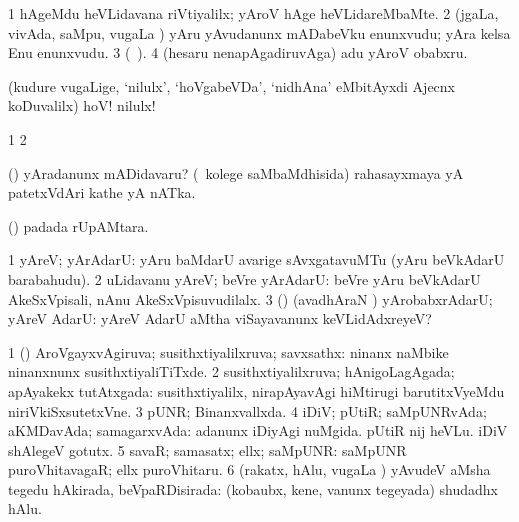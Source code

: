 {{{{{{\noindent 
\gl{\pagu}
\bmng
\bnum
\num{1}  hAgeMdu heVLidavana riVtiyalilx; yAroV hAge heVLidareMbaMte. 
\num{2}  (jgaLa, vivAda, saMpu, \mo vugaLa \vi) yAru yAvudanunx mADabeVku enunxvudu; yAra kelsa Enu enunxvudu. 
\num{3}  (\pagu\ ). 
\num{4} (hesaru nenapAgadiruvAga) adu yAroV obabxru. 
\enum
\emng
\eentry

\bentry
{}
  \gl{\BAavayx}\bmng
(kudure \mo vugaLige, `nilulx', `hoVgabeVDa', `nidhAna' eMbitAyxdi Ajecnx koDuvalilx) hoV! nilulx! 
\emng
\eentry

\bentry
{}
  \gl{\saMkiSx}\bmng
\bnum
\num{1}  
\num{2} 
\enum
\emng
\eentry

\bentry
{}
  \gl{\nA}\bmng
(\AmA) yAradanunx mADidavaru? (\kanmu\ kolege saMbaMdhisida) rahasayxmaya yA patetxVdAri kathe yA nATka. 
\emng
\eentry

\bentry
{}
  \gl{\sanA}\bmng
(\kAparx)  padada rUpAMtara. 
\emng
\eentry

\bentry
{} 
\gl{\sanA}
\expl{}
\bmng
\bnum
\num{1} yAreV; yArAdarU:  yAru baMdarU avarige sAvxgatavuMTu (yAru beVkAdarU barabahudu). 
\num{2} uLidavanu yAreV; beVre yArAdarU:  beVre yAru beVkAdarU AkeSxVpisali, nAnu AkeSxVpisuvudilalx. 
\num{3} (\AmA) (avadhAraN \parx) yArobabxrAdarU; yAreV AdarU:  yAreV AdarU aMtha viSayavanunx keVLidAdxreyeV? 
\enum
\emng
\eentry

\bentry
{} 
\gl{\gu}
\expl{}
\bmng
\bnum
\num{1} (\pArxparx) AroVgayxvAgiruva; susithxtiyalilxruva; savxsathx:  ninanx naMbike ninanxnunx susithxtiyaliTiTxde. 
\num{2} susithxtiyalilxruva; hAnigoLagAgada; apAyakekx tutAtxgada:  susithxtiyalilx, nirapAyavAgi hiMtirugi barutitxVyeMdu niriVkiSxsutetxVne. 
\num{3} pUNR; Binanxvallxda. 
\num{4} iDiV; pUtiR; saMpUNRvAda; aKMDavAda; samagarxvAda:  adanunx iDiyAgi nuMgida.  pUtiR nij heVLu.  iDiV shAlegeV gotutx. 
\num{5} savaR; samasatx; ellx; saMpUNR:  saMpUNR puroVhitavagaR; ellx puroVhitaru. 
\num{6} (rakatx, hAlu, \mo vugaLa \vi) yAvudeV aMsha tegedu hAkirada, beVpaRDisirada:  (kobaubx, kene, \mo vanunx tegeyada) shudadhx hAlu. 
\enum
\emng

}}}}}}
